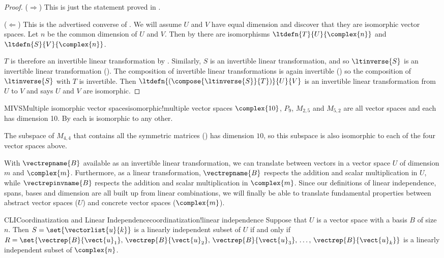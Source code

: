 %
\begin{proof}
($\Rightarrow$)  This is just the statement proved in .\par
%
($\Leftarrow$)  This is the advertised converse of .  We will assume $U$ and $V$ have equal dimension and discover that they are isomorphic vector spaces.  Let $n$ be the common dimension of $U$ and $V$.  Then by  there are isomorphisms $\ltdefn{T}{U}{\complex{n}}$ and $\ltdefn{S}{V}{\complex{n}}$.\par
%
$T$ is therefore an invertible linear transformation by .  Similarly, $S$ is an invertible linear transformation, and so $\ltinverse{S}$ is  an invertible linear transformation ().  The composition of invertible linear transformations is again invertible ()
so the composition of $\ltinverse{S}$ with $T$ is invertible.  Then $\ltdefn{\left(\compose{\ltinverse{S}}{T}\right)}{U}{V}$ is an invertible linear transformation from $U$ to $V$ and  says $U$ and $V$ are isomorphic.
%
\end{proof}
%
%
\begin{example}{MIVS}{Multiple isomorphic vector spaces}{isomorphic!multiple vector spaces}
$\complex{10}$, $P_{9}$, $M_{2,5}$ and $M_{5,2}$ are all vector spaces and each has dimension 10.  By  each is isomorphic to any other.\par
%
The subspace of $M_{4,4}$ that contains all the symmetric matrices () has dimension $10$, so this subspace is also isomorphic to each of the four vector spaces above.
%
\end{example}
%
%
With $\vectrepname{B}$ available as an invertible linear transformation, we can translate between vectors in a vector space $U$ of dimension $m$ and $\complex{m}$.  Furthermore, as a linear transformation, $\vectrepname{B}$ respects the addition and scalar multiplication in $U$, while $\vectrepinvname{B}$ respects the addition and scalar multiplication in $\complex{m}$.  Since our definitions of linear independence, spans, bases and dimension are all built up from linear combinations, we will finally be able to translate fundamental properties between abstract vector spaces ($U$) and concrete vector spaces ($\complex{m}$).
%
\begin{theorem}{CLI}{Coordinatization and Linear Independence}{coordinatization!linear independence}
Suppose that $U$ is a vector space with a basis $B$ of size $n$.  Then $S=\set{\vectorlist{u}{k}}$ is a linearly independent subset of $U$ if and only if $R=\set{\vectrep{B}{\vect{u}_1},\,\vectrep{B}{\vect{u}_2},\,\vectrep{B}{\vect{u}_3},\,\ldots,\,\vectrep{B}{\vect{u}_k}}$ is a linearly independent subset of $\complex{n}$.
\end{theorem}
